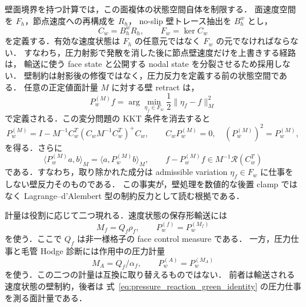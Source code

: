 壁面境界を持つ計算では，この面複体の状態空間自体を制限する．
面速度空間を $F_h$，節点速度への再構成を $R_h$，
no-slip 壁トレース抽出を $B_h^w$ とし，
\begin{equation}
  C_w = B_h^wR_h,\qquad
  F_w=\ker C_w
  \label{eq:wall_constrained_face_space}
\end{equation}
を定義する．有効な速度状態は
$F_h$ の任意元ではなく $F_w$ の元でなければならない．
すなわち，圧力射影で発散を消した後に節点壁速度だけを上書きする経路は，
輸送に使う face state と公開する nodal state を分裂させるため採用しない．
壁制約は射影後の修復ではなく，圧力反力を定義する前の状態空間である．
任意の正定値面計量 $M$ に対する壁 retract は，
\begin{equation}
  P_w^{(M)}f
  =
  \arg\min_{\eta_f\in F_w}
  \frac12\|\eta_f-f\|_{M}^{2}
  \label{eq:wall_metric_projection_problem}
\end{equation}
で定義される．この変分問題の KKT 条件を消去すると
\begin{equation}
  P_w^{(M)}
  =
  I
  -
  M^{-1}C_w^T
  \left(C_wM^{-1}C_w^T\right)^{+}
  C_w ,
  \qquad
  C_wP_w^{(M)}=0,\quad
  \left(P_w^{(M)}\right)^2=P_w^{(M)} ,
  \label{eq:wall_metric_retraction}
\end{equation}
を得る．さらに
\[
  \langle P_w^{(M)}a,b\rangle_M
  =
  \langle a,P_w^{(M)}b\rangle_M,\qquad
  f-P_w^{(M)}f\in M^{-1}\mathcal{R}(C_w^T)
\]
である．すなわち，取り除かれた成分は admissible variation
$\eta_f\in F_w$ に仕事をしない壁反力そのものである．
この事実が，壁処理を数値的な後置 clamp ではなく
Lagrange--d'Alembert 型の制約反力として読む根拠である．

計量は役割に応じて二つ現れる．速度状態の保存形輸送には
\[
  M_f=Q_f\rho_f,\qquad P_w^{(f)}=P_w^{(M_f)}
\]
を使う．ここで $Q_f$ は非一様格子の face control measure である．
一方，圧力仕事と毛管 Hodge 診断には作用中の圧力計量
\begin{equation}
  M_A = Q_f/\alpha_f,\qquad P_w^{(A)}=P_w^{(M_A)}
  \label{eq:pressure_metric_roles}
\end{equation}
を使う．この二つの計量は互換に取り替えるものではない．
前者は輸送される速度状態の壁制約，後者は
式~\eqref{eq:pressure_reaction_green_identity} の圧力仕事を測る面計量である．

